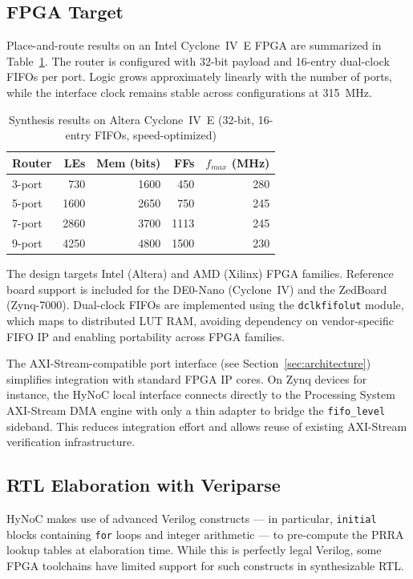 \subsection{FPGA Target}

Place-and-route results on an Intel Cyclone~IV~E FPGA are summarized in
Table~\ref{tab:synth}. The router is configured with 32-bit payload and 16-entry
dual-clock FIFOs per port. Logic grows approximately linearly with the number of
ports, while the interface clock remains stable across configurations at 315~MHz.

\begin{table}[h]
\centering
\caption{Synthesis results on Altera Cyclone~IV~E (32-bit, 16-entry FIFOs, speed-optimized)}
\label{tab:synth}
\begin{tabular}{@{}lrrrr@{}}
\toprule
Router & LEs & Mem (bits) & FFs & $f_{max}$ (MHz) \\
\midrule
3-port & 730  & 1600 & 450  & 280 \\
5-port & 1600 & 2650 & 750  & 245 \\
7-port & 2860 & 3700 & 1113 & 245 \\
9-port & 4250 & 4800 & 1500 & 230 \\
\bottomrule
\end{tabular}
\end{table}

The design targets Intel (Altera) and AMD (Xilinx) FPGA families. Reference board
support is included for the DE0-Nano (Cyclone~IV) and the ZedBoard (Zynq-7000).
Dual-clock FIFOs are implemented using the \texttt{dclkfifolut} module, which
maps to distributed LUT RAM, avoiding dependency on vendor-specific FIFO IP and
enabling portability across FPGA families.

The AXI-Stream-compatible port interface (see Section~\ref{sec:architecture})
simplifies integration with standard FPGA IP cores. On Zynq devices for instance,
the HyNoC local interface connects directly to the Processing System AXI-Stream
DMA engine with only a thin adapter to bridge the \texttt{fifo\_level} sideband.
This reduces integration effort and allows reuse of existing AXI-Stream
verification infrastructure.

\subsection{RTL Elaboration with Veriparse}

HyNoC makes use of advanced Verilog constructs — in particular, \texttt{initial}
blocks containing \texttt{for} loops and integer arithmetic — to pre-compute the
PRRA lookup tables at elaboration time. While this is perfectly legal Verilog, some
FPGA toolchains have limited support for such constructs in synthesizable RTL.

